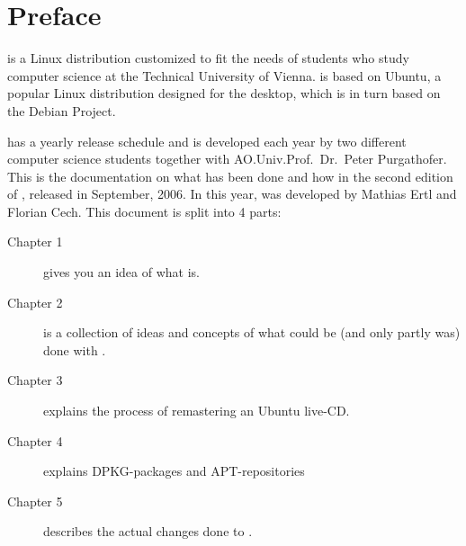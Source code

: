 
\maketitle

\chapter{Preface}
\tunix{} is a Linux distribution customized to fit the needs of students who study
computer science at the Technical University of Vienna. \tunix{} is based on
Ubuntu, a popular Linux distribution designed for the desktop, which is in turn
based on the Debian Project.

\tunix{} has a yearly release schedule and is developed each year by two different 
computer science students together with AO.Univ.Prof.\ Dr.\ Peter Purgathofer. 
This is the documentation on what has been done and how in the second
edition of \tunix, released in September, 2006. In this year, \tunix{} was developed
by Mathias Ertl and Florian Cech. This document is split into 4 parts:
\begin{description}
\item[Chapter 1] gives you an idea of what \tunix{} is.
\item[Chapter 2] is a collection of ideas and concepts of what could be (and only
partly was) done with \tunix.
\item[Chapter 3] explains the process of remastering an Ubuntu live-CD.
\item[Chapter 4] explains DPKG-packages and APT-repositories
\item[Chapter 5] describes the actual changes done to \tunix.
\end{description}


\tableofcontents
\lstlistoflistings

